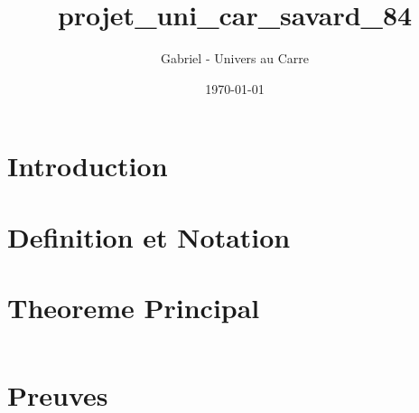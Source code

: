 \documentclass[12pt]{article}
\title{projet_uni_car_savard_84}
\author{Gabriel - Univers au Carre}
\date{\today}
\begin{document}
\maketitle


\section{Introduction}



\section{Definition et Notation}



\section{Theoreme Principal}


\begin{equation}
\end{equation}


\section{Preuves}


\end{document}
